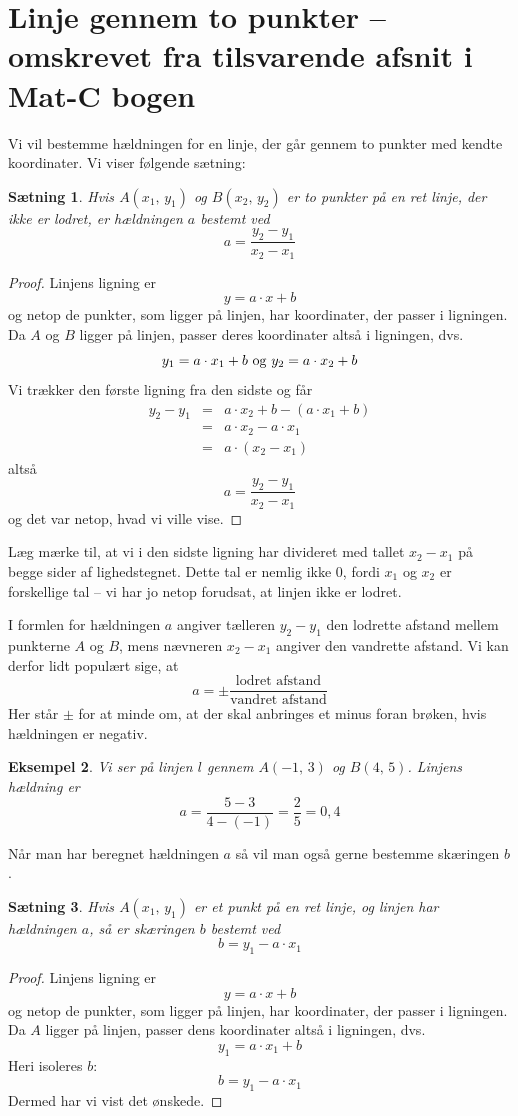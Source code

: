 \documentclass[12pt,oneside,a4paper]{article}
\newcommand{\bas}{\begin{eqnarray*}}
\newcommand{\eas}{\end{eqnarray*}}
\newtheorem{thm}{Sætning}[section]
\newtheorem{eks}[thm]{Eksempel}
\begin{document}
\section{Linje gennem to punkter -- omskrevet fra tilsvarende afsnit i Mat-C bogen}
Vi vil bestemme hældningen for en linje, der går gennem
to punkter med kendte koordinater. Vi viser følgende sætning:
\begin{thm}
    Hvis $A(x_1,\,y_1)$ og $B(x_2,\,y_2)$ er to punkter på en ret linje, der ikke
    er lodret, er hældningen $a$ bestemt ved
    $$
    a = \frac{y_2-y_1}{x_2-x_1}
    $$
\end{thm}
\begin{proof}
    Linjens ligning er 
    $$
    y = a\cdot x + b
    $$
    og netop de punkter, som ligger på linjen, har koordinater, der passer i
    ligningen.  Da $A$ og $B$ ligger på linjen, passer deres koordinater altså
    i ligningen, dvs.
    $$
    y_1 = a\cdot x_1 + b \,\, {\rm og} \,\, y_2 = a\cdot x_2 + b 
    $$
    Vi trækker den første ligning fra den sidste og får
    \bas
    y_2 - y_1 &=& a\cdot x_2 + b - (a\cdot x_1 + b) \\
              &=& a\cdot x_2 - a\cdot x_1 \\
              &=& a\cdot \left(x_2-x_1\right) 
    \eas
    altså
    $$
    a = \frac{y_2-y_1}{x_2-x_1}
    $$
    og det var netop, hvad vi ville vise.
\end{proof}

Læg mærke til, at vi i den sidste ligning har divideret med tallet $x_2-x_1$ på
begge sider af lighedstegnet. Dette tal er nemlig ikke $0$, fordi $x_1$ og
$x_2$ er forskellige tal -- vi har jo netop forudsat, at linjen ikke er lodret.

I formlen for hældningen $a$ angiver tælleren $y_2-y_1$ den lodrette afstand
mellem punkterne $A$ og $B$, mens nævneren $x_2-x_1$ angiver den vandrette
afstand. Vi kan derfor lidt populært sige, at
$$
a = \pm \frac{\mbox{lodret afstand}}{\mbox{vandret afstand}}
$$
Her står $\pm$ for at minde om, at der skal anbringes et minus foran brøken,
hvis hældningen er negativ.
\begin{eks}
    Vi ser på linjen $l$ gennem $A(-1,\,3)$ og $B(4,\,5)$.
    Linjens hældning er
    $$
    a = \frac{5-3}{4-(-1)} = \frac{2}{5} = 0,4
    $$
\end{eks}

Når man har beregnet hældningen $a$ så vil man også gerne bestemme skæringen
$b$.
\begin{thm}
    Hvis $A(x_1,\,y_1)$ er et punkt på en ret linje, og linjen har hældningen
    $a$, så er skæringen $b$ bestemt ved
    $$
    b = y_1 - a\cdot x_1
    $$
\end{thm}
\begin{proof}
    Linjens ligning er 
    $$
    y = a\cdot x + b
    $$
    og netop de punkter, som ligger på linjen, har koordinater, der passer i
    ligningen.  Da $A$ ligger på linjen, passer dens koordinater altså i
    ligningen, dvs.
    $$
    y_1 = a\cdot x_1 + b 
    $$
    Heri isoleres $b$:
    $$
    b = y_1 - a\cdot x_1
    $$
Dermed har vi vist det ønskede.
\end{proof}
\end{document}
